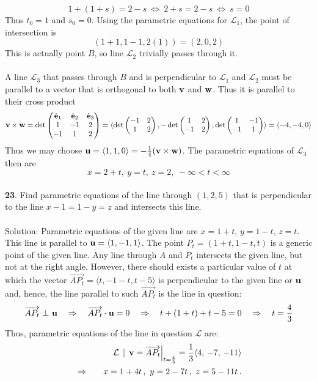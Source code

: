 \documentclass[12pt]{amsbook}
\let\cal\mathcal
\newcommand{\la}{\langle}
\newcommand{\ra}{\rangle}
\begin{document}
 $$1+(1+s)=2-s \ \Leftrightarrow \ 2+s=2-s \ \Leftrightarrow \ s=0$$
 Thus $t_0=1$ and $s_0=0$. Using the parametric equations for $\mathcal{L}_1$, the point of intersection is
 $$(1+1, 1-1, 2(1))= (2,0,2)$$
This is actually point $B$, so line $\mathcal{L}_2$ trivially passes through it. 
\\
\\
A line $\mathcal{L}_3$ that passes through $B$ and is perpendicular to  $\mathcal{L}_1$ and $\mathcal{L}_2$ must be parallel to a vector that is orthogonal to both $\bf v$ and $\bf w$. Thus it is parallel to their cross product
$${\bf v}\times{\bf w}=\det
\begin{pmatrix}
\hat{\bf e}_1 & \hat{\bf e}_2 & \hat{\bf e}_3\cr 1&-1&2\cr -1&1&2 \end{pmatrix}=\la \det\begin{pmatrix}-1&2\cr 1&2  \end{pmatrix}, -\det\begin{pmatrix}1&2\cr -1&2  \end{pmatrix}, \det\begin{pmatrix}1&-1\cr -1&1 \end{pmatrix} \ra = \la -4,-4,0 \ra$$
Thus we may choose ${\bf u}=\la 1,1,0 \ra = -\frac{1}{4}({\bf v}\times{\bf w})$.
The parametric equations of $\mathcal{L}_3$ then are
  $$x=2+t, \ y=t, \ z=2, \ -\infty<t<\infty$$ 
\\
{\small\bf 23}. Find parametric equations of the line 
through $(1,2,5)$ that is perpendicular to the line
$x-1=1-y=z$ and intersects this line.\\
\\
{\sc Solution}: Parametric equations of the given line 
are $x=1+t$, $y=1-t$, $z=t$. This line is parallel to ${\bf u}
=\langle 1,-1,1\rangle$. The point $P_t=(1+t,1-t,t)$ is a generic 
point of the given line. Any line through $A$ and $P_t$ intersects 
the given line, but not at the right angle. However, there should exists
a particular value of $t$ at which the vector $\overrightarrow{AP_t}=
\langle t,-1-t,t-5\rangle$
is perpendicular to the given line or ${\bf u}$ and, hence, the line parallel to
such $\overrightarrow{AP_t}$ is the line in question:
$$
\overrightarrow{AP_t} \ \bot\ {\bf u}\quad\Rightarrow\quad
\overrightarrow{AP_t}\cdot {\bf u}=0\quad\Rightarrow\quad
t+(1+t)+t-5=0\quad\Rightarrow\quad t=\frac 43
$$
Thus, parametric equations of the line in question ${\cal L}$ are:
\begin{eqnarray*}
&&\quad {\cal L}\ \|\ {\bf v}=\overrightarrow{AP_t}\Bigr|_{t=\frac 43}=\frac 13
\langle 4,\, -7,\, -11\rangle\\
&\Rightarrow&\quad
x=1+4t\,,\ y=2-7t\,,\ z=5-11t\,.
\end{eqnarray*}
\end{document}
